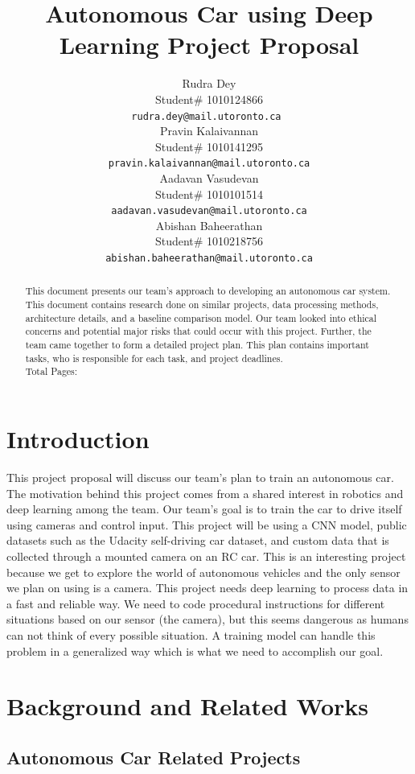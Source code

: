 \documentclass{article} %
\title{Autonomous Car using Deep Learning Project Proposal\\}
\author{Rudra Dey  \\
Student\# 1010124866\\
\texttt{rudra.dey@mail.utoronto.ca } \\
\And
Pravin Kalaivannan  \\
Student\# 1010141295 \\
\texttt{pravin.kalaivannan@mail.utoronto.ca} \\
\AND
Aadavan Vasudevan  \\
Student\# 1010101514 \\
\texttt{aadavan.vasudevan@mail.utoronto.ca} \\
\And
Abishan Baheerathan \\
Student\# 1010218756 \\
\texttt{abishan.baheerathan@mail.utoronto.ca} \\
\AND
}
\begin{document}
\maketitle

\begin{abstract}
This document presents our team's approach to developing an autonomous car system. This document contains research done on similar projects, data processing methods, 
architecture details, and a baseline comparison model. Our team looked into ethical 
concerns and potential major risks that could occur with this project. Further, the team came 
together to form a detailed project plan. This plan contains important tasks, 
who is responsible for each task, and project deadlines.\\
Total Pages: \pageref{last_page}
\end{abstract}



\section{Introduction}


This project proposal will discuss our team’s plan to train an 
autonomous car. The motivation behind this project comes from a shared interest in robotics and deep 
learning among the team. Our team’s goal is to train the car to drive itself using cameras and control 
input. This project will be using a CNN model, public datasets such as the Udacity self-driving car dataset, 
and custom data that is collected through a mounted camera on an RC car. This is an interesting project 
because we get to explore the world of autonomous vehicles and the only sensor we plan on using is a camera. 
This project needs deep learning to process data in a fast and reliable way. We need to code procedural 
instructions for different situations based on our sensor (the camera), but this seems dangerous as humans 
can not think of every possible situation. A training model can handle this problem in a generalized way 
which is what we need to accomplish our goal. 
 



\section{Background and Related Works}
\label{headings}

\subsection{Autonomous Car Related Projects}
\end{document}

